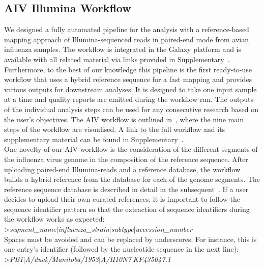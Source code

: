 \subsection{AIV Illumina Workflow}\label{sec:aiv-wf}
We designed a fully automated pipeline for the analysis with a reference-based mapping approach of Illumina-sequenced reads in paired-end mode from avian influenza samples. The workflow is integrated in the Galaxy platform and is available with all related material via links provided in Supplementary~. Furthermore, to the best of our knowledge this pipeline is the first ready-to-use workflow that uses a hybrid reference sequence for a fast mapping and provides various outputs for downstream analyses. It is designed to take one input sample at a time and quality reports are emitted during the workflow run. The outputs of the individual analysis steps can be used for any consecutive research based on the user's objectives. The \ac{AIV} workflow is outlined in~, where the nine main steps of the workflow are visualised. A link to the full workflow and its supplementary material can be found in Supplementary~.\\
One novelty of our \ac{AIV} workflow is the consideration of the different segments of the influenza virus genome in the composition of the reference sequence. After uploading paired-end Illumina-reads and a reference database, the workflow builds a hybrid reference from the database for each of the genome segments. The reference sequence database is described in detail in the subsequent~. If a user decides to upload their own curated references, it is important to follow the sequence identifier pattern so that the extraction of sequence identifiers during the workflow works as expected: \\ >\textit{segment\_name$\mid$influenza\_strain$\mid$subtype$\mid$accession\_number}\\ Spaces must be avoided and can be replaced by underscores. For instance, this is one entry's identifier (followed by the nucleotide sequence in the next line): \\ >\textit{PB1$\mid$A/duck/Manitoba/1953$\mid$A/H10N7$\mid$KF435047.1} 

